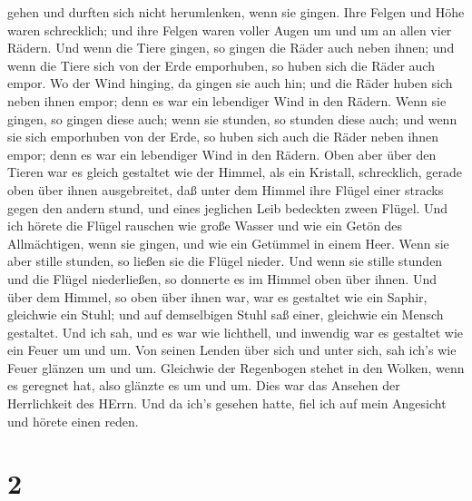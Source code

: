 gehen und durften sich nicht herumlenken, wenn sie gingen. 
Ihre Felgen und Höhe waren schrecklich; und ihre Felgen waren voller
Augen um und um an allen vier Rädern.  Und wenn die Tiere
gingen, so gingen die Räder auch neben ihnen; und wenn die Tiere sich
von der Erde emporhuben, so huben sich die Räder auch empor.
 Wo der Wind hinging, da gingen sie auch hin; und die Räder
huben sich neben ihnen empor; denn es war ein lebendiger Wind in den
Rädern.  Wenn sie gingen, so gingen diese auch; wenn sie
stunden, so stunden diese auch; und wenn sie sich emporhuben von der
Erde, so huben sich auch die Räder neben ihnen empor; denn es war ein
lebendiger Wind in den Rädern.  Oben aber über den Tieren
war es gleich gestaltet wie der Himmel, als ein Kristall, schrecklich,
gerade oben über ihnen ausgebreitet,  daß unter dem Himmel
ihre Flügel einer stracks gegen den andern stund, und eines jeglichen
Leib bedeckten zween Flügel.  Und ich hörete die Flügel
rauschen wie große Wasser und wie ein Getön des Allmächtigen, wenn sie
gingen, und wie ein Getümmel in einem Heer. Wenn sie aber stille
stunden, so ließen sie die Flügel nieder.  Und wenn sie
stille stunden und die Flügel niederließen, so donnerte es im Himmel
oben über ihnen.  Und über dem Himmel, so oben über ihnen
war, war es gestaltet wie ein Saphir, gleichwie ein Stuhl; und auf
demselbigen Stuhl saß einer, gleichwie ein Mensch gestaltet.
 Und ich sah, und es war wie lichthell, und inwendig war es
gestaltet wie ein Feuer um und um. Von seinen Lenden über sich und unter
sich, sah ich's wie Feuer glänzen um und um.  Gleichwie der
Regenbogen stehet in den Wolken, wenn es geregnet hat, also glänzte es
um und um. Dies war das Ansehen der Herrlichkeit des HErrn. Und da ich's
gesehen hatte, fiel ich auf mein Angesicht und hörete einen reden.

\hypertarget{section-1}{%
\section{2}\label{section-1}}

